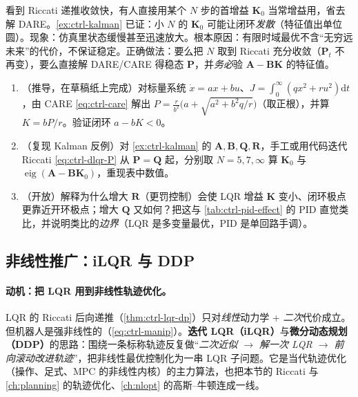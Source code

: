 \begin{pitfall}
看到 Riccati 递推收敛快，有人直接用某个 $N$ 步的首增益 $\mathbf{K}_0$ 当常增益用，省去解 DARE。\cref{ex:ctrl-kalman} 已证：小 $N$ 的 $\mathbf{K}_0$ 可能让闭环\emph{发散}（特征值出单位圆）。现象：仿真里状态缓慢甚至迅速放大。根本原因：有限时域最优不含“无穷远未来”的代价，不保证稳定。正确做法：要么把 $N$ 取到 Riccati 充分收敛（$\mathbf{P}_t$ 不再变），要么直接解 DARE/CARE 得稳态 $\mathbf{P}$，并\emph{务必}验 $\mathbf{A}-\mathbf{B}\mathbf{K}$ 的特征值。
\end{pitfall}

\begin{practice}
\begin{enumerate}
  \item （推导，在草稿纸上完成）对标量系统 $\dot x=ax+bu$、$J=\int_0^\infty(qx^2+ru^2)\mathrm dt$，由 CARE \cref{eq:ctrl-care} 解出 $P=\frac{r}{b^2}\big(a+\sqrt{a^2+b^2q/r}\big)$（取正根），并算 $K=bP/r$。验证闭环 $a-bK<0$。
  \item （复现 Kalman 反例）对 \cref{ex:ctrl-kalman} 的 $\mathbf{A},\mathbf{B},\mathbf{Q},\mathbf{R}$，手工或用代码迭代 Riccati \cref{eq:ctrl-dlqr-P} 从 $\mathbf{P}=\mathbf{Q}$ 起，分别取 $N=5,7,\infty$ 算 $\mathbf{K}_0$ 与 $\operatorname{eig}(\mathbf{A}-\mathbf{B}\mathbf{K}_0)$，重现表中数值。
  \item （开放）解释为什么增大 $\mathbf{R}$（更罚控制）会使 LQR 增益 $\mathbf{K}$ 变小、闭环极点更靠近开环极点；增大 $\mathbf{Q}$ 又如何？把这与 \cref{tab:ctrl-pid-effect} 的 PID 直觉类比，并说明类比的\emph{边界}（LQR 是多变量最优，PID 是单回路手调）。
\end{enumerate}
\end{practice}

\subsection{非线性推广：iLQR 与 DDP}
\label{sec:ctrl-ilqr-ddp}

\paragraph{动机：把 LQR 用到非线性轨迹优化。}
LQR 的 Riccati 后向递推（\cref{thm:ctrl-lqr-dp}）只对\emph{线性}动力学 + \emph{二次}代价成立。但机器人是强非线性的（\cref{eq:ctrl-manip}）。\textbf{迭代 LQR（iLQR）}与\textbf{微分动态规划（DDP）}的思路：围绕一条标称轨迹反复做“\emph{二次近似 $\to$ 解一次 LQR $\to$ 前向滚动改进轨迹}”，把非线性最优控制化为一串 LQR 子问题\cite{tedrake_underactuated}。它是当代轨迹优化（操作、足式、MPC 的非线性内核）的主力算法，也把本节的 Riccati 与 \cref{ch:planning} 的轨迹优化、\cref{ch:nlopt} 的高斯--牛顿连成一线。

